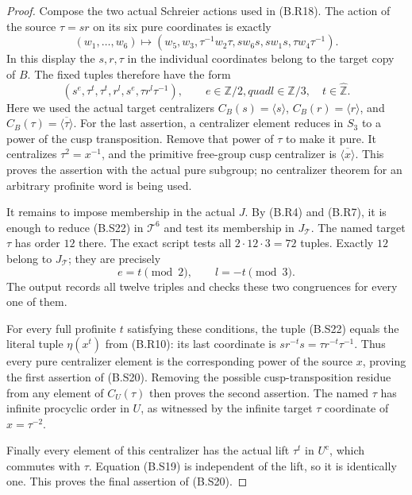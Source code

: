 \begin{proof}
Compose the two actual Schreier actions used in
(B.R18).  The action of the source $\tau=sr$ on its
six pure coordinates is exactly
\[
 (w_1,\ldots,w_6)\longmapsto
 (w_5,w_3,\tau^{-1}w_2\tau,
                    sw_6s,sw_1s,\tau w_4\tau^{-1}).            \tag{B.S21}
\]
In this display the $s,r,\tau$ in the individual
coordinates belong to the target copy of $B$.
The fixed tuples therefore have the form
\[
 (s^e,\tau^t,\tau^t,r^l,s^e,\tau r^l\tau^{-1}),
 \qquad e\in\mathbb Z/2,quad l\in\mathbb Z/3,
                       \quad t\in\widehat{\mathbb Z}.         \tag{B.S22}
\]
Here we used the actual target centralizers
$C_B(s)=\langle s\rangle$, $C_B(r)=\langle r\rangle$,
and $C_B(\tau)=\overline{\langle\tau\rangle}$.
For the last assertion, a centralizer element reduces
in $S_3$ to a power of the cusp transposition.  Remove
that power of $\tau$ to make it pure.  It centralizes
$\tau^2=x^{-1}$, and the primitive free-group cusp
centralizer is $\overline{\langle x\rangle}$.  This
proves the assertion with the actual pure subgroup;
no centralizer theorem for an arbitrary profinite
word is being used.

It remains to impose membership in the actual $J$.
By (B.R4) and (B.R7), it is enough to reduce (B.S22)
in $\mathcal T^6$ and test its membership in
$J_{\mathcal T}$.  The named target $\tau$ has order
$12$ there.  The exact script
 tests all
$2\cdot12\cdot3=72$ tuples.  Exactly $12$ belong
to $J_{\mathcal T}$; they are precisely
\[
                    e=t\pmod2,\qquad l=-t\pmod3.              \tag{B.S23}
\]
The output records all twelve triples and checks
these two congruences for every one of them.

For every full profinite $t$ satisfying these conditions,
the tuple (B.S22) equals the literal tuple $\eta(x^t)$
from (B.R10): its last coordinate is
$sr^{-t}s=\tau r^{-t}\tau^{-1}$.  Thus every pure
centralizer element is the corresponding power of
the source $x$, proving the first assertion of
(B.S20).  Removing the possible cusp-transposition
residue from any element of $C_U(\tau)$ then proves
the second assertion.  The named $\tau$ has infinite
procyclic order in $U$, as witnessed by the infinite
target $\tau$ coordinate of $x=\tau^{-2}$.

Finally every element of this centralizer has the
actual lift $\tau^t$ in $U^{\mathrm c}$, which
commutes with $\tau$.  Equation (B.S19) is independent
of the lift, so it is identically one.  This proves
the final assertion of (B.S20).
\end{proof}

